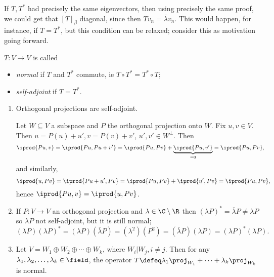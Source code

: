 \begin{remark}
    If $T, T^\ast$ had precisely the same eigenvectors, then using precisely the same proof, we could get that $[T]_\beta$ diagonal, since then $T v_n = \overline{\lambda} v_n$. This would happen, for instance, if $T = T^\ast$, but this condition can be relaxed; consider this as motivation going forward.
\end{remark}

\begin{definition}[Normality]
    $T : V \to V$ is called \begin{itemize}
        \item \emph{normal} if $T$ and $T^\ast$ commute, ie $T \circ T^\ast = T^\ast \circ T$;
        \item \emph{self-adjoint} if $T = T^\ast$.
    \end{itemize}
\end{definition}

\begin{example}
    \begin{enumerate}[label=(\alph*)]
        \item Orthogonal projections are self-adjoint. 
        
        Let $W \subseteq V$ a subspace and $P$ the orthogonal projection onto $W$. Fix $u, v \in V$. Then $u = P(u) + u', v = P(v) + v'$, $u', v' \in W^\perp$. Then \begin{align*}
            \iprod{Pu, v} = \iprod{Pu, Pu + v'} &= \iprod{Pu, Pv} + \underbrace{\iprod{Pu, v'}}_{= 0}= \iprod{Pu, Pv},
        \end{align*}
        and similarly, \[\iprod{u, Pv} = \iprod{Pu + u', Pv} = \iprod{Pu, Pv} + \iprod{u', Pv} = \iprod{Pu, Pv},\]
        hence $\iprod{Pu, v} = \iprod{u, Pv}$.
        \item If $P : V \to V$ an orthogonal projection and $\lambda \in \C\setminus \R$ then $(\lambda P)^\ast = \overline{\lambda} P \neq \lambda P$ so $\lambda P$ not self-adjoint, but it is still normal; \[
        (\lambda P) (\lambda P)^\ast = (\lambda P)(\overline{\lambda} P) = (\lambda^2)(P^2) = (\overline{\lambda} P)(\lambda P) = (\lambda P)^\ast (\lambda P).
        \]
        \item Let $V = W_1 \oplus W_2 \oplus \cdots \oplus W_k$, where $W_i \vert W_j, i \neq j$. Then for any $\lambda_1, \lambda_2, \dots, \lambda_k \in \field$, the operator $T \defeq \lambda_1 \proj_{W_1} + \cdots + \lambda_k \proj_{W_k}$ is normal.
    \end{enumerate}
\end{example}

